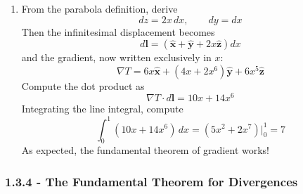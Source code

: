 \documentclass[a4paper]{article}
\begin{document}
\begin{enumerate}[label=(\alph*)]
\begin{enumerate}[label=(\roman*)]
\begin{align*}
			\nabla T \cdot d \pmb{l} & = 2 \, dy
		\end{align*}
		\[
			\int^{1}_{0} 2 \, dy = 2  
		\]
		\item \underline{\( \!\left( 0,1,1 \right) \rightarrow \!\left( 1,1,1 \right) \)}: 
		\begin{align*}
			y & = z = 1 \\
			dy & = dz = 0 \\ 
			\nabla T \cdot d \pmb{l} & = \!\left( 2x + 4 \right) \, dx
		\end{align*}
		\[
			\int^{1}_{0} \!\left( 2x + 4 \right) \, dx = 5  
		\]
	\end{enumerate}
	Combining the path contributions, we derive the same result, as anticipated from the fundamental theorem for gradients.
	\[
		\int^{\pmb{b}}_{\pmb{a}} \nabla T \cdot d \pmb{l} = 7  
	\]
	\item From the parabola definition, derive
	\[
		dz = 2x \, dx, \qquad dy = dx 
	\]
	Then the infinitesimal displacement becomes
	\[
		d \pmb{l} = \!\left( \pmb{\hat{x}} + \pmb{\hat{y}} + 2x \pmb{\hat{z}} \right)dx 
	\]
	and the gradient, now written exclusively in \( x \):
	\[
		\nabla T = 6x \pmb{\hat{x}} + \!\left( 4x + 2x^{6} \right)\pmb{\hat{y}} + 6x^{5}\pmb{\hat{z}} 
	\]
	Compute the dot product as 
	\[
		\nabla T \cdot d \pmb{l} = 10x + 14x^{6}  
	\]
	Integrating the line integral, compute
	\[
		\int^{1}_{0} \!\left( 10x + 14x^{6} \right) \, dx = \!\left( 5x^{2} + 2x^{7} \right)\Big|^{1}_{0} = 7
	\]
	As expected, the fundamental theorem of gradient works!
\end{enumerate}

\newpage
\subsubsection{\textsf{1.3.4 - The Fundamental Theorem for Divergences}}
\end{document}
